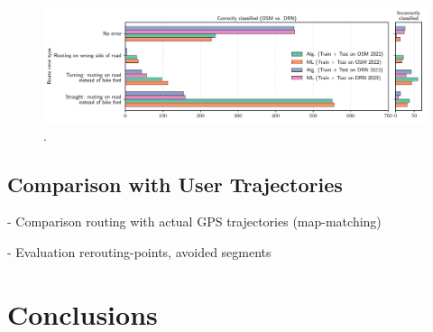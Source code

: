 \begin{figure}[htbp]
\centering 
\includegraphics[width=\linewidth]{images/matching-route-errors-osm-vs-drn.pdf}
\caption{.}
\label{fig:}
\end{figure}

\subsection{Comparison with User Trajectories}

- Comparison routing with actual GPS trajectories (map-matching)

- Evaluation rerouting-points, avoided segments

\section{Conclusions}